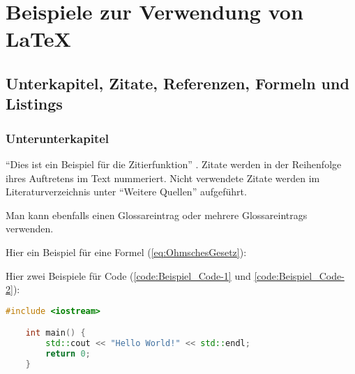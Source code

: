 


\chapter{Beispiele zur Verwendung von LaTeX}
   
\section{Unterkapitel, Zitate, Referenzen, Formeln und Listings}
\label{sec:Unterkapitel}

\subsection{Unterunterkapitel}

\enquote{Dies ist ein Beispiel für die Zitierfunktion} \cite[Vgl.][S. 1 ff.]{2024}. Zitate werden in der Reihenfolge ihres Auftretens im Text nummeriert. Nicht verwendete Zitate werden im Literaturverzeichnis unter \enquote{Weitere Quellen} aufgeführt.

Man kann ebenfalls einen \gls{Glossareintrag} oder mehrere \glspl{Glossareintrag} verwenden.

Hier ein Beispiel für eine Formel (\autoref{eq:OhmschesGesetz}):

Hier zwei Beispiele für Code (\autoref{code:Beispiel_Code-1} und \autoref{code:Beispiel_Code-2}):

\begin{lstlisting}[language=C++, caption={Beispiel: direktes einfügen von Code}, label={code:Beispiel_Code-1}]
    #include <iostream>

    int main() {
        std::cout << "Hello World!" << std::endl;
        return 0;
    }
\end{lstlisting}




